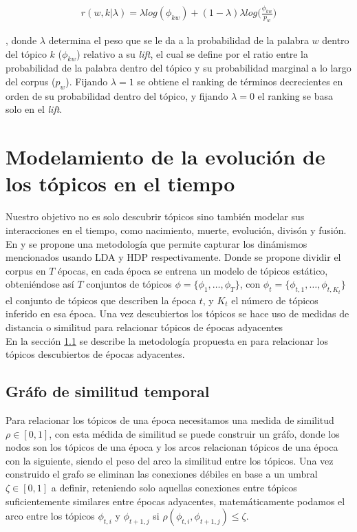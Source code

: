 \documentclass[letterpaper,12pt,oneside]{book} %
\begin{document}
\begin{align}
    r(w,k|\lambda) = \lambda log (\phi_{kw})+ (1-\lambda)\lambda log\bigg(\frac{\phi_{kw}}{p_{w}}\bigg)
\end{align}

, donde $\lambda$ determina el peso que se le da a la probabilidad de la palabra $w$ dentro del tópico $k$ ($\phi_{kw}$) relativo a su \textit{lift}, el cual se define por el ratio entre la probabilidad de la palabra dentro del tópico y su probabilidad marginal a lo largo del corpus ($p_w$). Fijando $\lambda=1$ se obtiene el ranking de términos decrecientes en orden de su probabilidad dentro del tópico, y fijando $\lambda=0$ el ranking se basa solo en el \textit{lift}.

\section{Modelamiento de la evolución de los tópicos en el tiempo}

Nuestro objetivo no es solo descubrir tópicos sino también modelar sus interacciones en el tiempo, como nacimiento, muerte, evolución, divisón y fusión.\\ 

En \citep{wilson2011tracking} y \citep{beykikhoshk2018discovering} se propone una metodología que permite capturar los dinámismos mencionados usando LDA y HDP respectivamente. Donde se propone dividir el corpus en $T$ épocas, en cada época se entrena un modelo de tópicos estático, obteniéndose así $T$ conjuntos de tópicos $\phi=\{\phi_{1}, \ldots, \phi_{T}\}$, con $\phi_{t}=\{\phi_{t,1}, \ldots, \phi_{t,K_{t}}\}$ el conjunto de tópicos que describen la época $t$, y $K_{t}$ el número de tópicos inferido en esa época. Una vez descubiertos los tópicos se hace uso de medidas de distancia o similitud para relacionar tópicos de épocas adyacentes \\

En la sección \ref{sec:similarity_graph} se describe la metodología propuesta en \citep{beykikhoshk2018discovering} para relacionar los tópicos descubiertos de épocas adyacentes.

\subsection{Gráfo de similitud temporal}
\label{sec:similarity_graph}
Para relacionar los tópicos de una época necesitamos una medida de similitud $\rho \in [0,1]$, con esta médida de similitud se puede construir un gráfo, donde los nodos son los tópicos de una época y los arcos relacionan tópicos de una época con la siguiente, siendo el peso del arco la similitud entre los tópicos. Una vez construido el grafo se eliminan las conexiones débiles en base a un umbral $\zeta \in [0,1]$ a definir, reteniendo solo aquellas conexiones entre tópicos suficientemente similares entre épocas adyacentes, matemáticamente podamos el arco entre los tópicos $\phi_{t,i}$ y $\phi_{t+1,j}$ si $\rho(\phi_{t,i}, \phi_{t+1,j})\leq \zeta$.\\
\end{document}
